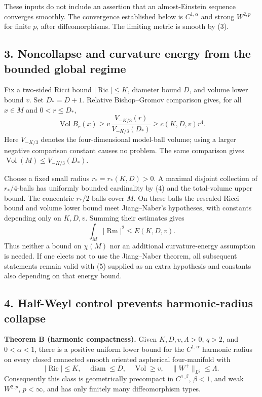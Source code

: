\documentclass[
  11pt,
]{article}
\begin{document}
These inputs do not include an assertion that an almost-Einstein
sequence converges smoothly. The convergence established below is
\(C^{1,\alpha}\) and strong \(W^{2,p}\) for finite \(p\), after
diffeomorphisms. The limiting metric is smooth by (3).

\hypertarget{noncollapse-and-curvature-energy-from-the-bounded-global-regime}{%
\subsection{3. Noncollapse and curvature energy from the bounded global
regime}\label{noncollapse-and-curvature-energy-from-the-bounded-global-regime}}

Fix a two-sided Ricci bound \(|\operatorname{Ric}|\le K\), diameter
bound \(D\), and volume lower bound \(v\). Set \(D_*=D+1\). Relative
Bishop--Gromov comparison gives, for all \(x\in M\) and \(0<r\le D_*\),
\[
 \operatorname{Vol}B_r(x)
   \ge v\,\frac{V_{-K/3}(r)}{V_{-K/3}(D_*)}
   \ge c(K,D,v)r^4.                                    \tag{4}
\] Here \(V_{-K/3}\) denotes the four-dimensional model-ball volume;
using a larger negative comparison constant causes no problem. The same
comparison gives \(\operatorname{Vol}(M)\le V_{-K/3}(D_*)\).

Choose a fixed small radius \(r_*=r_*(K,D)>0\). A maximal disjoint
collection of \(r_*/4\)-balls has uniformly bounded cardinality by (4)
and the total-volume upper bound. The concentric \(r_*/2\)-balls cover
\(M\). On these balls the rescaled Ricci bound and volume lower bound
meet Jiang--Naber's hypotheses, with constants depending only on
\(K,D,v\). Summing their estimates gives \[
                 \int_M|\operatorname{Rm}|^2\le E(K,D,v).
                                                               \tag{5}
\] Thus neither a bound on \(\chi(M)\) nor an additional
curvature-energy assumption is needed. If one elects not to use the
Jiang--Naber theorem, all subsequent statements remain valid with (5)
supplied as an extra hypothesis and constants also depending on that
energy bound.

\hypertarget{half-weyl-control-prevents-harmonic-radius-collapse}{%
\subsection{4. Half-Weyl control prevents harmonic-radius
collapse}\label{half-weyl-control-prevents-harmonic-radius-collapse}}

\textbf{Theorem B (harmonic compactness).} Given \(K,D,v,\Lambda>0\),
\(q>2\), and \(0<\alpha<1\), there is a positive uniform lower bound for
the \(C^{1,\alpha}\) harmonic radius on every closed connected smooth
oriented aspherical four-manifold with \[
 |\operatorname{Ric}|\le K,\quad \operatorname{diam}\le D,
 \quad\operatorname{Vol}\ge v,
 \quad\|W^+\|_{L^q}\le\Lambda.                         \tag{6}
\] Consequently this class is geometrically precompact in
\(C^{1,\beta}\), \(\beta<1\), and weak \(W^{2,p}\), \(p<\infty\), and
has only finitely many diffeomorphism types.
\end{document}
